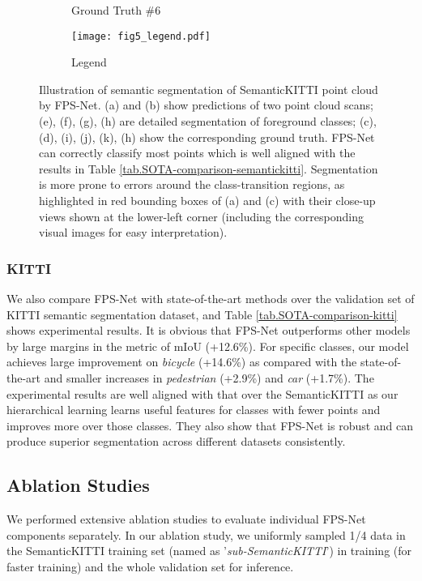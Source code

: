 \documentclass[preprint,review,3p]{elsarticle}
\begin{document}
\begin{figure}
\begin{subfigure}[b]{0.24\textwidth}
  \caption{Ground Truth \#6}
  \end{subfigure}
  \begin{subfigure}[b]{0.9\textwidth}
  \texttt{[image: fig5\_legend.pdf]}
  \caption{Legend}
  \end{subfigure}
  \caption{Illustration of semantic segmentation of SemanticKITTI point cloud by FPS-Net. (a) and (b) show predictions of two point cloud scans; (e), (f), (g), (h) are detailed segmentation of foreground classes; (c), (d), (i), (j), (k), (h) show the corresponding ground truth. FPS-Net can correctly classify most points which is well aligned with the results in Table \ref{tab.SOTA-comparison-semantickitti}. Segmentation is more prone to errors around the class-transition regions, as highlighted in red bounding boxes of (a) and (c) with their close-up views shown at the lower-left corner (including the corresponding visual images for easy interpretation).}
  \label{figure.vis_semantickitti}
\end{figure}

\subsubsection{KITTI} 

We also compare FPS-Net with state-of-the-art methods over the validation set of KITTI semantic segmentation dataset, and Table \ref{tab.SOTA-comparison-kitti} shows experimental results. It is obvious that FPS-Net outperforms other models by large margins in the metric of mIoU (+12.6\%). For specific classes, our model achieves large improvement on \textit{bicycle} (+14.6\%) as compared with the state-of-the-art and smaller increases in \textit{pedestrian} (+2.9\%) and \textit{car} (+1.7\%). The experimental results are well aligned with that over the SemanticKITTI as our hierarchical learning learns useful features for classes with fewer points and improves more over those classes. They also show that FPS-Net is robust and can produce superior segmentation across different datasets consistently.

\subsection{Ablation Studies}\label{Sec.ablation_study}
We performed extensive ablation studies to evaluate individual FPS-Net components separately. In our ablation study, we uniformly sampled 1/4 data in the SemanticKITTI training set (named as '\textit{sub-SemanticKITTI}') in training (for faster training) and the whole validation set for inference.
\end{document}

